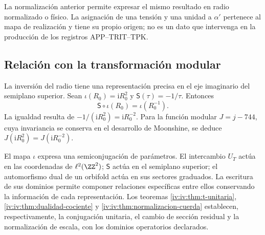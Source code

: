 La normalización anterior permite expresar el mismo resultado en
radio normalizado o físico. La asignación de una tensión y una
unidad a \(\alpha'\) pertenece al mapa de realización y tiene
su propio origen; no es un dato que intervenga en la producción
de los registros APP--TRIT--TPK.

\subsection{Relación con la transformación modular}

La inversión del radio tiene una representación precisa en el
eje imaginario del semiplano superior. Sean
\(\iota(R_0)=\mathrm iR_0^2\) y
\(\mathsf S(\tau)=-1/\tau\). Entonces
\begin{equation}
 \mathsf S\circ\iota(R_0)=\iota(R_0^{-1}).
 \label{iv:iv:eq:semiconjugacion-modular}
\end{equation}
La igualdad resulta de
\(-1/(\mathrm iR_0^2)=\mathrm iR_0^{-2}\). Para la función
modular \(J=j-744\), cuya invariancia se conserva en el
desarrollo de Moonshine, se deduce
\(J(\mathrm iR_0^2)=J(\mathrm iR_0^{-2})\).

El mapa \(\iota\) expresa una semiconjugación de parámetros.
El intercambio \(U_T\) actúa en las coordenadas de
\(\ell^2(\ZZ^2)\); \(\mathsf S\) actúa en el semiplano
superior; el automorfismo dual de un orbifold actúa en sus
sectores graduados. La escritura de sus dominios permite
componer relaciones específicas entre ellos conservando la
información de cada representación. Los teoremas
\ref{iv:iv:thm:t-unitaria}, \ref{iv:iv:thm:dualidad-cociente}
y \ref{iv:iv:thm:normalizacion-cuerda} establecen, respectivamente,
la conjugación unitaria, el cambio de sección residual y la
normalización de escala, con los dominios operatorios declarados.
